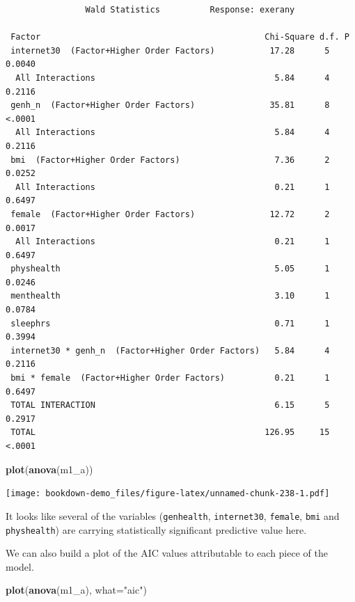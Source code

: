 \documentclass[]{book}
\newenvironment{Shaded}{\begin{snugshade}}{\end{snugshade}}
\newcommand{\KeywordTok}[1]{\textcolor[rgb]{0.13,0.29,0.53}{\textbf{#1}}}
\newcommand{\DataTypeTok}[1]{\textcolor[rgb]{0.13,0.29,0.53}{#1}}
\newcommand{\StringTok}[1]{\textcolor[rgb]{0.31,0.60,0.02}{#1}}
\newcommand{\NormalTok}[1]{#1}
\theoremstyle{definition}
\theoremstyle{definition}
\theoremstyle{definition}
\theoremstyle{remark}
\begin{document}
\begin{verbatim}
                Wald Statistics          Response: exerany 

 Factor                                             Chi-Square d.f. P     
 internet30  (Factor+Higher Order Factors)           17.28      5   0.0040
  All Interactions                                    5.84      4   0.2116
 genh_n  (Factor+Higher Order Factors)               35.81      8   <.0001
  All Interactions                                    5.84      4   0.2116
 bmi  (Factor+Higher Order Factors)                   7.36      2   0.0252
  All Interactions                                    0.21      1   0.6497
 female  (Factor+Higher Order Factors)               12.72      2   0.0017
  All Interactions                                    0.21      1   0.6497
 physhealth                                           5.05      1   0.0246
 menthealth                                           3.10      1   0.0784
 sleephrs                                             0.71      1   0.3994
 internet30 * genh_n  (Factor+Higher Order Factors)   5.84      4   0.2116
 bmi * female  (Factor+Higher Order Factors)          0.21      1   0.6497
 TOTAL INTERACTION                                    6.15      5   0.2917
 TOTAL                                              126.95     15   <.0001
\end{verbatim}

\begin{Shaded}
\begin{Highlighting}[]
\KeywordTok{plot}\NormalTok{(}\KeywordTok{anova}\NormalTok{(m1_a))}
\end{Highlighting}
\end{Shaded}

\texttt{[image: bookdown-demo\_files/figure-latex/unnamed-chunk-238-1.pdf]}

It looks like several of the variables (\texttt{genhealth},
\texttt{internet30}, \texttt{female}, \texttt{bmi} and
\texttt{physhealth}) are carrying statistically significant predictive
value here.

We can also build a plot of the AIC values attributable to each piece of
the model.

\begin{Shaded}
\begin{Highlighting}[]
\KeywordTok{plot}\NormalTok{(}\KeywordTok{anova}\NormalTok{(m1_a), }\DataTypeTok{what=}\StringTok{"aic"}\NormalTok{)}
\end{Highlighting}
\end{Shaded}
\end{document}
